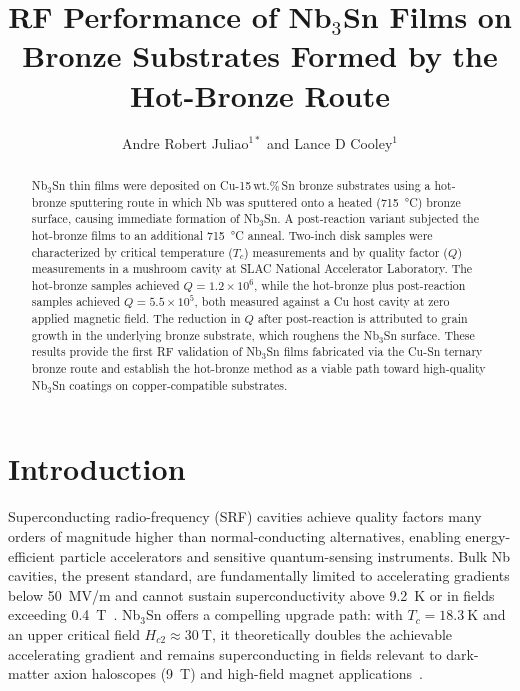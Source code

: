 \documentclass{iopjournal}
\begin{document}

\title{RF Performance of Nb$_3$Sn Films on Bronze Substrates Formed by the Hot-Bronze Route}

\author{Andre Robert Juliao$^{1*}$ and Lance D Cooley$^{1}$}





\begin{abstract}
Nb$_3$Sn thin films were deposited on Cu-15\,wt.\%\,Sn bronze substrates using a hot-bronze sputtering route in which Nb was sputtered onto a heated (\qty{715}{\degreeCelsius}) bronze surface, causing immediate formation of Nb$_3$Sn. A post-reaction variant subjected the hot-bronze films to an additional \qty{715}{\degreeCelsius} anneal. Two-inch disk samples were characterized by critical temperature ($T_c$) measurements and by quality factor ($Q$) measurements in a mushroom cavity at SLAC National Accelerator Laboratory. The hot-bronze samples achieved $Q = 1.2\times10^6$, while the hot-bronze plus post-reaction samples achieved $Q = 5.5\times10^5$, both measured against a Cu host cavity at zero applied magnetic field. The reduction in $Q$ after post-reaction is attributed to grain growth in the underlying bronze substrate, which roughens the Nb$_3$Sn surface. These results provide the first RF validation of Nb$_3$Sn films fabricated via the Cu-Sn ternary bronze route and establish the hot-bronze method as a viable path toward high-quality Nb$_3$Sn coatings on copper-compatible substrates.
\end{abstract}


\section{Introduction}

Superconducting radio-frequency (SRF) cavities achieve quality factors many orders of magnitude higher than normal-conducting alternatives, enabling energy-efficient particle accelerators and sensitive quantum-sensing instruments. Bulk Nb cavities, the present standard, are fundamentally limited to accelerating gradients below \qty{50}{MV/m} and cannot sustain superconductivity above \qty{9.2}{\kelvin} or in fields exceeding \qty{0.4}{\tesla}~\cite{padamseeRFSuperconductivity2009}. Nb$_3$Sn offers a compelling upgrade path: with $T_c = \qty{18.3}{\kelvin}$ and an upper critical field $H_{c2} \approx \qty{30}{\tesla}$, it theoretically doubles the achievable accelerating gradient and remains superconducting in fields relevant to dark-matter axion haloscopes (\qty{9}{\tesla}) and high-field magnet applications~\cite{gurevichUseNotUse2011, posenMeasurementHighQuality2022}.
\end{document}
